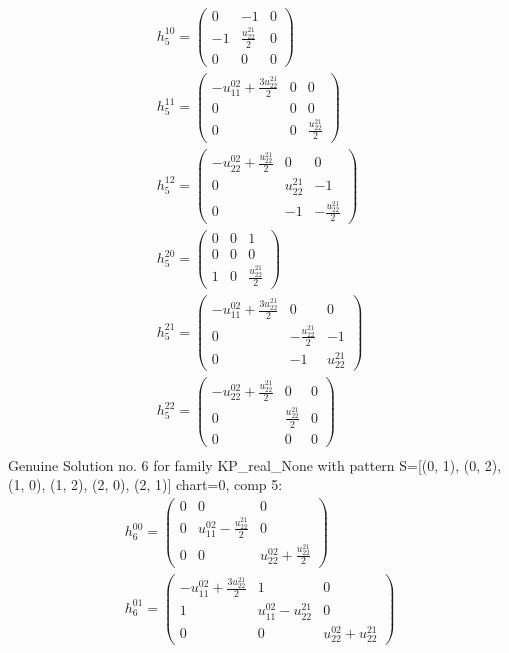 \documentclass[a4paper, 11pt, twoside, onecolumn]{article}
\begin{document}
\begin{landscape}
\begin{gather*}
	 h_{5}^{10}=\begin{pmatrix}0 & -1 & 0\\-1 & \frac{u^{21}_{22}}{2} & 0\\0 & 0 & 0\end{pmatrix}\\ 
	 h_{5}^{11}=\begin{pmatrix}- u^{02}_{11} + \frac{3 u^{21}_{22}}{2} & 0 & 0\\0 & 0 & 0\\0 & 0 & \frac{u^{21}_{22}}{2}\end{pmatrix}\\ 
	 h_{5}^{12}=\begin{pmatrix}- u^{02}_{22} + \frac{u^{21}_{22}}{2} & 0 & 0\\0 & u^{21}_{22} & -1\\0 & -1 & - \frac{u^{21}_{22}}{2}\end{pmatrix}\\ 
	 h_{5}^{20}=\begin{pmatrix}0 & 0 & 1\\0 & 0 & 0\\1 & 0 & \frac{u^{21}_{22}}{2}\end{pmatrix}\\ 
	 h_{5}^{21}=\begin{pmatrix}- u^{02}_{11} + \frac{3 u^{21}_{22}}{2} & 0 & 0\\0 & - \frac{u^{21}_{22}}{2} & -1\\0 & -1 & u^{21}_{22}\end{pmatrix}\\ 
	 h_{5}^{22}=\begin{pmatrix}- u^{02}_{22} + \frac{u^{21}_{22}}{2} & 0 & 0\\0 & \frac{u^{21}_{22}}{2} & 0\\0 & 0 & 0\end{pmatrix}\\ 
\end{gather*} 
Genuine Solution no. 6 for family KP_real_None with pattern S=[(0, 1), (0, 2), (1, 0), (1, 2), (2, 0), (2, 1)] chart=0, comp 5: 
\begin{gather*} 
	 h_{6}^{00}=\begin{pmatrix}0 & 0 & 0\\0 & u^{02}_{11} - \frac{u^{21}_{22}}{2} & 0\\0 & 0 & u^{02}_{22} + \frac{u^{21}_{22}}{2}\end{pmatrix}\\ 
	 h_{6}^{01}=\begin{pmatrix}- u^{02}_{11} + \frac{3 u^{21}_{22}}{2} & 1 & 0\\1 & u^{02}_{11} - u^{21}_{22} & 0\\0 & 0 & u^{02}_{22} + u^{21}_{22}\end{pmatrix}\\ 

\end{gather*}
\end{landscape}
\end{document}
